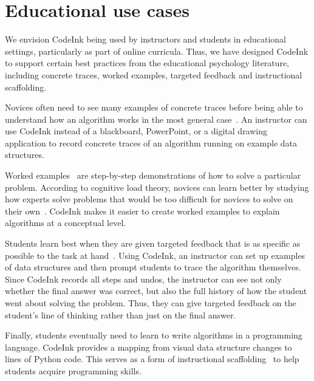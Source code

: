 \section{Educational use cases}

We envision CodeInk being used by instructors and students in educational
settings, particularly as part of online curricula. Thus, we have designed
CodeInk to support certain best practices from the educational psychology
literature, including concrete traces, worked examples, targeted feedback and
instructional scaffolding.

Novices often need to see many examples of concrete traces before being able to
understand how an algorithm works in the most general case~\cite{Detienne90}. An
instructor can use CodeInk instead of a blackboard, PowerPoint, or a digital
drawing application to record concrete traces of an algorithm running on example
data structures.


Worked examples~\cite{Sweller1985} are step-by-step demonstrations of
how to solve a particular problem. According to cognitive load theory,
novices can learn better by studying how experts solve problems that
would be too difficult for novices to solve on their
own~\cite{Linn1992}. CodeInk makes it easier to create worked examples
to explain algorithms at a conceptual level.

Students learn best when they are given targeted feedback that is
as specific as possible to the task at hand~\cite{Balzer1989}. Using
CodeInk, an instructor can set up examples of data structures and then
prompt students to trace the algorithm themselves. Since CodeInk records
all steps and undos, the instructor can see not only whether the final
answer was correct, but also the full history of how the student went
about solving the problem. Thus, they can give targeted feedback on the
student's line of thinking rather than just on the final answer.

Finally, students eventually need to learn to write algorithms in a programming
language. CodeInk provides a mapping from visual data structure changes to lines
of Python code. This serves as a form of instructional
scaffolding~\cite{Pea2004} to help students acquire programming skills.

